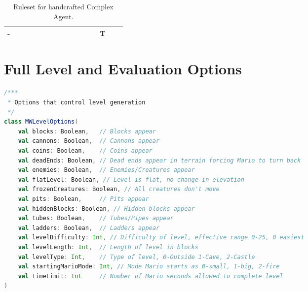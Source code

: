 \begin{appendices}
\begin{table}[!h]
\begin{adjustwidth}{-2cm}{-2cm}
\begin{center}
\begin{tabular}{ | c | c | c | c | c | c | c | c | c | c | c | c || c | c | c | c |}
	-  & & & & & & & & & & & 		& & T & & \\ \hline
    \end{tabular}
  \end{center}
  \end{adjustwidth}
  \caption{Ruleset for handcrafted Complex Agent.}
  \label{tab:CA}
\end{table}

\section{Full Level and Evaluation Options}
\label{app:loem}
\setcounter{lstlisting}{0}

\begin{minipage}{0.9\linewidth}
\begin{lstlisting}[language=scala, basicstyle=\scriptsize\ttfamily, caption={Full field definitions for MW\-Level\-Options and MW\-Evaluation\-Multipliers described in Section \ref{subsec:paramclasses}}]
/***
 * Options that control level generation
 */
class MWLevelOptions(
    val blocks: Boolean,   // Blocks appear
    val cannons: Boolean,  // Cannons appear
    val coins: Boolean,    // Coins appear
    val deadEnds: Boolean, // Dead ends appear in terrain forcing Mario to turn back
    val enemies: Boolean,  // Enemies/Creatures appear
    val flatLevel: Boolean, // Level is flat, no change in elevation
    val frozenCreatures: Boolean, // All creatures don't move
    val pits: Boolean,     // Pits appear
    val hiddenBlocks: Boolean, // Hidden blocks appear
    val tubes: Boolean,    // Tubes/Pipes appear
    val ladders: Boolean,  // Ladders appear
    val levelDifficulty: Int, // Difficulty of level, effective range 0-25, 0 easiest
    val levelLength: Int,  // Length of level in blocks
    val levelType: Int,    // Type of level, 0-Outside 1-Cave, 2-Castle
    val startingMarioMode: Int, // Mode Mario starts as 0-small, 1-big, 2-fire
    val timeLimit: Int     // Number of Mario seconds allowed to complete level
)


\end{lstlisting}
\end{minipage}
\end{appendices}
